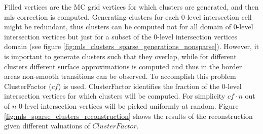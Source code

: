 Filled vertices are the MC grid vertices for which clusters are generated, and then mls correction is computed. Generating clusters for each 0-level intersection cell might be redundant, thus clusters can be computed not for all domain of 0-level intersection vertices but just for a subset of the 0-level intersection vertices domain (see figure \ref{fig:mls_clusters_sparse_generations_nonsparse}). However, it is important to generate clusters such that they overlap, while for different clusters different surface approximations is computed and thus in the border areas non-smooth transitions can be observed. To accomplish this problem ClusterFactor ($cf$) is used. ClusterFactor identifies the fraction of the 0-level intersection vertices for which clusters will be computed. For simplicity $cf \cdot n$ out of $n$ 0-level intersection vertices will be picked uniformly at random. Figure \ref{fig:mls_sparse_clusters_reconstruction} shows the results of the reconstruction given different valuations of $ClusterFactor$.
